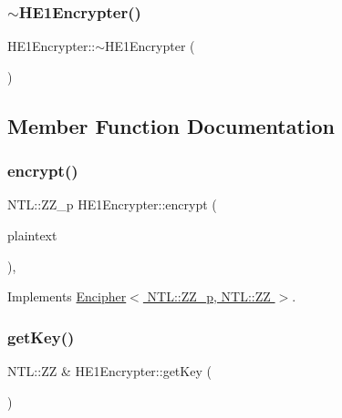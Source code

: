 \subsubsection{\texorpdfstring{$\sim$\+H\+E1\+Encrypter()}{~HE1Encrypter()}}
{\footnotesize\ttfamily H\+E1\+Encrypter\+::$\sim$\+H\+E1\+Encrypter (\begin{DoxyParamCaption}{ }\end{DoxyParamCaption})\hspace{0.3cm}{\ttfamily [virtual]}}



\subsection{Member Function Documentation}
\mbox{\label{classHE1Encrypter_afc178d8e27a1263bef824bfc8960dbc0}} 
\subsubsection{\texorpdfstring{encrypt()}{encrypt()}}
{\footnotesize\ttfamily N\+T\+L\+::\+Z\+Z\+\_\+p H\+E1\+Encrypter\+::encrypt (\begin{DoxyParamCaption}\item[{N\+T\+L\+::\+ZZ \&}]{plaintext }\end{DoxyParamCaption})\hspace{0.3cm}{\ttfamily [override]}, {\ttfamily [virtual]}}



Implements \hyperlink{classEncipher_aaf8138eb280608bfd03c6eb762ffc010}{Encipher$<$ N\+T\+L\+::\+Z\+Z\+\_\+p, N\+T\+L\+::\+Z\+Z $>$}.

\mbox{\label{classHE1Encrypter_a014c9eca9d9979fa45dad79b355a95cc}} 
\subsubsection{\texorpdfstring{get\+Key()}{getKey()}}
{\footnotesize\ttfamily N\+T\+L\+::\+ZZ \& H\+E1\+Encrypter\+::get\+Key (\begin{DoxyParamCaption}{ }\end{DoxyParamCaption})}

